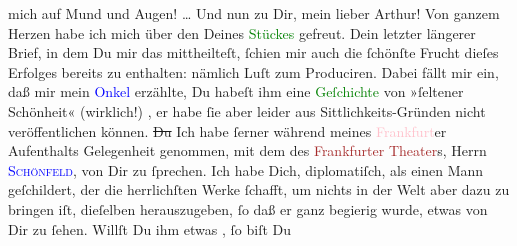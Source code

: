 \documentclass[twoside=false,titlepage=false,open=any, parskip=never, fontsize=12pt, headings=small, chapterprefix=false, appendixprefix=false]{scrbook}
\newcommand{\strikeout}[1]{\sout{#1}}
\newcommand{\pbposition}{\depth}
\newcommand{\pb}{\nobreak\hspace{0pt}\raisebox{-0.1em}{\raisebox{\pbposition}{\textnormal{|}}}\nobreak\hspace{0pt}}
\begin{document}
               mich auf Mund und Augen! {\dots}\pend
           \pstart
           {\pb}Und nun zu Dir, mein lieber Arthur! Von ganzem
               Herzen habe ich mich über den \label{K_L02668-3v}\label{K_L02668-3h} Deines \textcolor{green}{Stückes}{} gefreut. Dein letzter
               längerer Brief, in dem Du mir das mittheilteſt, ſchien mir auch die ſchönſte Frucht
               dieſes Erfolges bereits zu enthalten: nämlich Luſt zum Produciren. Dabei fällt mir
               ein, daß mir mein \textcolor{blue}{Onkel}{}
               erzählte, Du habeſt ihm eine \textcolor{green}{Geſchichte}{} von »ſeltener Schönheit« (wirklich!) \label{K_L02668-4v}\label{K_L02668-4h}, er habe ſie aber leider aus Sittlichkeits-Gründen nicht veröffentlichen
               können. \strikeout{Du} Ich habe ſerner während meines \textcolor{pink}{Frankfurt}{}\ledrightnote{\textcolor{pink}{Frankfurt am Main}}er Aufenthalts Gelegenheit genommen, mit
               dem \label{K_L02668-5v}\label{K_L02668-5h} des
                  \textcolor{brown}{Frankfurter Theater}{}\ledrightnote{\textcolor{brown}{Frankfurter Stadt-Theater}}s, Herrn \textsc{\textcolor{blue}{Schönfeld}{}\ledrightnote{\textcolor{blue}{Karl Schönfeld}}}, von Dir zu ſprechen. Ich habe Dich, diplomatiſch, als einen Mann geſchildert,
               der die herrlichſten Werke ſchafft, um nichts in der Welt aber dazu zu bringen iſt,
               dieſelben herauszugeben, ſo daß er ganz begierig wurde, etwas von Dir zu ſehen.
               Willſt Du ihm etwas \label{K_L02668-6v}\label{K_L02668-6h}, ſo biſt Du
\end{document}
